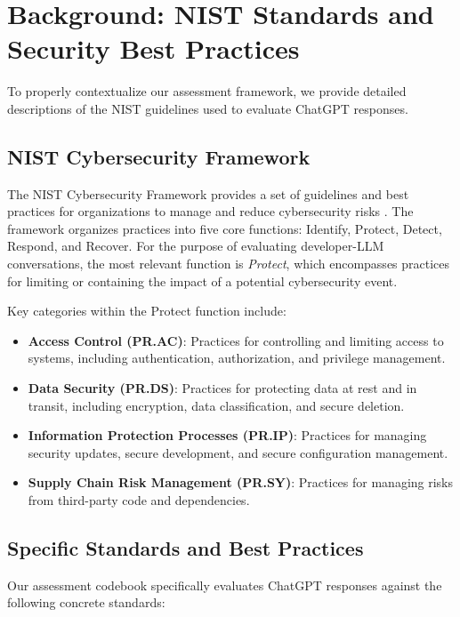 \documentclass[12pt]{article}
\begin{document}
\section{Background: NIST Standards and Security Best Practices}
 
To properly contextualize our assessment framework, we provide detailed descriptions of the NIST guidelines used to evaluate ChatGPT responses.
 
\subsection{NIST Cybersecurity Framework}
 
The NIST Cybersecurity Framework provides a set of guidelines and best practices for organizations to manage and reduce cybersecurity risks \citep{nist2018framework}. The framework organizes practices into five core functions: Identify, Protect, Detect, Respond, and Recover. For the purpose of evaluating developer-LLM conversations, the most relevant function is \textit{Protect}, which encompasses practices for limiting or containing the impact of a potential cybersecurity event.
 
Key categories within the Protect function include:
\begin{itemize}
    \item \textbf{Access Control (PR.AC)}: Practices for controlling and limiting access to systems, including authentication, authorization, and privilege management.
    \item \textbf{Data Security (PR.DS)}: Practices for protecting data at rest and in transit, including encryption, data classification, and secure deletion.
    \item \textbf{Information Protection Processes (PR.IP)}: Practices for managing security updates, secure development, and secure configuration management.
    \item \textbf{Supply Chain Risk Management (PR.SY)}: Practices for managing risks from third-party code and dependencies.
\end{itemize}
 
\subsection{Specific Standards and Best Practices}
 
Our assessment codebook specifically evaluates ChatGPT responses against the following concrete standards:
 
\end{document}
